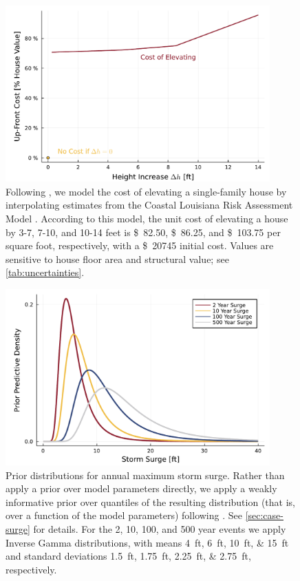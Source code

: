 \documentclass[ef,draft]{agutexSI2019}
\newcommand{\usd}[1]{\SI{#1}[\$]{}}
\begin{document}
\begin{figure}
      \centering
      \includegraphics[width=4in]{cost-up-front}
      \caption{
            Following , we model the cost of elevating a single-family house by interpolating estimates from the Coastal Louisiana Risk Assessment Model \cite{johnson_clara:2013}.
            According to this model, the unit cost of elevating a house by 3-7, 7-10, and 10-14 feet is \usd{82.50}, \usd{86.25}, and \usd{103.75} per square foot, respectively, with a \usd{20745} initial cost.
            Values are sensitive to house floor area and structural value; see \cref{tab:uncertainties}.
      }\label{fig:cost-up-front}
\end{figure}

\begin{figure}
      \centering
      \includegraphics[width=4in]{surge-gev-priors}
      \caption{
            Prior distributions for annual maximum storm surge.
            Rather than apply a prior over model parameters directly, we apply a weakly informative prior over quantiles of the resulting distribution (that is, over a function of the model parameters) following .
            See \cref{sec:case-surge} for details.
            For the 2, 10, 100, and 500 year events we apply Inverse Gamma distributions, with means \SIlist{4;6;10;15}{ft} and standard deviations \SIlist{1.5;1.75;2.25;2.75}{ft}, respectively.
      }\label{fig:surge-gev-priors}
\end{figure}
\end{document}
